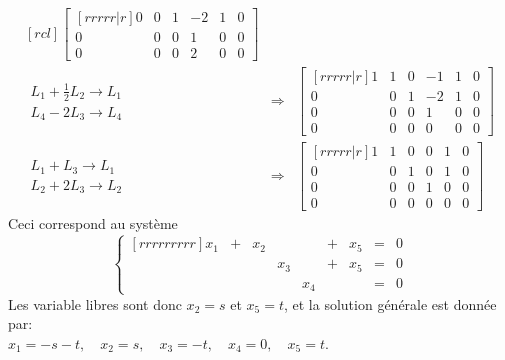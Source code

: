 \begin{exemple}
\[\begin{matrix}[rcl]
\begin{bmatrix}[rrrrr|r]
		0&0&1&-2&1&0\\
		0&0&0&1&0&0\\
		0&0&0&2&0&0
		\end{bmatrix}
	\\[20pt]
		\begin{matrix}
		L_1 + \frac{1}{2}L_2 \rightarrow L_1 \\[5pt]
		L_4 - 2L_3 \rightarrow L_4
		\end{matrix}
		&\Longrightarrow&
		\begin{bmatrix}[rrrrr|r]
		1 & 1 &0&-1&1&0\\
		0&0&1&-2&1&0\\
		0&0&0&1&0&0\\
		0&0&0&0&0&0
		\end{bmatrix}
	\\[20pt]
		\begin{matrix}
		L_1 + L_3 \rightarrow L_1 \\[5pt]
		L_2 + 2L_3 \rightarrow L_2
		\end{matrix}
		&\Longrightarrow&
		\begin{bmatrix}[rrrrr|r]
		1 & 1 &0&0&1&0\\
		0&0&1&0&1&0\\
		0&0&0&1&0&0\\
		0&0&0&0&0&0
		\end{bmatrix}
	\end{matrix}
	\]
	Ceci correspond au système
	\[
	\left\{
	\begin{matrix}[rrrrrrrrr]
	x_1 &+& x_2 &&&+&x_5 &=& 0 \\
	&&&x_3&&+&x_5&=&0\\
	&&&&x_4&&&=&0
	\end{matrix}
	\right.
	\]
	Les variable libres sont donc $x_2=s$ et $x_5=t$, et la solution générale est donnée par:\\
	$x_1=-s-t, \quad x_2=s, \quad x_3=-t, \quad x_4=0, \quad x_5=t$.
\end{exemple}

